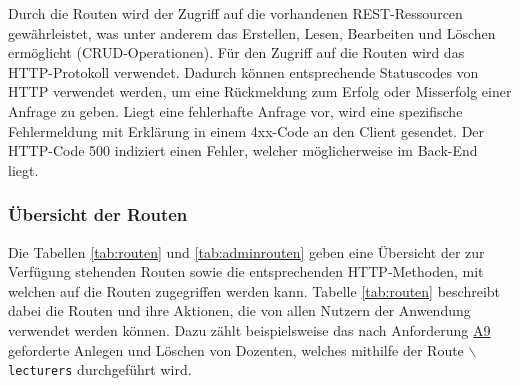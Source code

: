 Durch die Routen wird der Zugriff auf die vorhandenen \ac{REST}-Ressourcen gewährleistet, was unter anderem das Erstellen, Lesen, Bearbeiten und Löschen ermöglicht (CRUD-Operationen).
Für den Zugriff auf die Routen wird das \acs{HTTP}-Protokoll verwendet.
Dadurch können entsprechende Statuscodes von \acs{HTTP} verwendet werden, um eine Rückmeldung zum Erfolg oder Misserfolg einer Anfrage zu geben. 
Liegt eine fehlerhafte Anfrage vor, wird eine spezifische Fehlermeldung mit Erklärung in einem 4xx-Code an den Client gesendet.
Der \acs{HTTP}-Code 500 indiziert einen Fehler, welcher möglicherweise im Back-End liegt.


\subsubsection{Übersicht der Routen}
Die Tabellen \ref{tab:routen} und \ref{tab:adminrouten} geben eine Übersicht der zur Verfügung stehenden Routen sowie die entsprechenden \acs{HTTP}-Methoden, mit welchen auf die Routen zugegriffen werden kann. 
Tabelle \ref{tab:routen} beschreibt dabei die Routen und ihre Aktionen, die von allen Nutzern der Anwendung verwendet werden können.
Dazu zählt beispielsweise das nach Anforderung \hyperref[tab:Anforderungen]{A9} geforderte Anlegen und Löschen von Dozenten, welches mithilfe der Route \texttt{$\backslash$lecturers} durchgeführt wird. 

